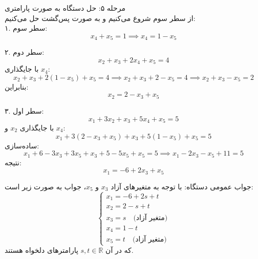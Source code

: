 {\begin{example}[]
	
	مرحله ۵: حل دستگاه به صورت پارامتری  \\
	از سطر سوم شروع می‌کنیم و به صورت پس‌گشت حل می‌کنیم:\\
	
	۱. سطر سوم:
	\[
	x_4 + x_5 = 1 \implies x_4 = 1 - x_5
	\]
	
	۲. سطر دوم:
	\[
	x_2 + x_3 + 2x_4 + x_5 = 4
	\]
	با جایگذاری \(x_4\):
	\[
	x_2 + x_3 + 2(1 - x_5) + x_5 = 4 \implies x_2 + x_3 + 2 - x_5 = 4 \implies x_2 + x_3 - x_5 = 2
	\]
	بنابراین:
	\[
	x_2 = 2 - x_3 + x_5
	\]
	
	۳. سطر اول:
	\[
	x_1 + 3x_2 + x_3 + 5x_4 + x_5 = 5
	\]
	با جایگذاری \(x_2\) و \(x_4\):
	\[
	x_1 + 3(2 - x_3 + x_5) + x_3 + 5(1 - x_5) + x_5 = 5
	\]
	ساده‌سازی:
	\[
	x_1 + 6 - 3x_3 + 3x_5 + x_3 + 5 - 5x_5 + x_5 = 5 \implies x_1 - 2x_3 - x_5 + 11 = 5
	\]
	نتیجه:
	\[
	x_1 = -6 + 2x_3 + x_5
	\]
	
	
	 جواب عمومی دستگاه:
	با توجه به متغیرهای آزاد \(x_3\) و \(x_5\)، جواب به صورت زیر است:
	\[
	\begin{cases}
		x_1 = -6 + 2s + t \\
		x_2 = 2 - s + t \\
		x_3 = s \quad \text{(متغیر آزاد)} \\
		x_4 = 1 - t \\
		x_5 = t \quad \text{(متغیر آزاد)}
	\end{cases}
	\]
	که در آن \(s, t \in \mathbb{R}\) پارامترهای دلخواه هستند.
\end{example}}


